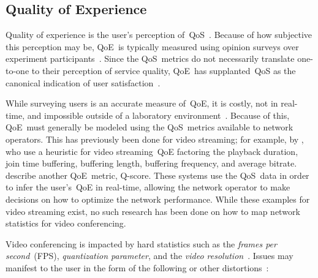 
    \subsection{Quality of Experience}\label{introduction:qoe}
        Quality of experience is the user's perception of~QoS~\autocite{ChenYanjiao2015FQtQ}. Because of how subjective this perception may be, QoE~is typically measured using opinion surveys over experiment participants~\autocite{ChenYanjiao2015FQtQ,RodrriguezDemóstenesZ2014Vqai}. Since the QoS~metrics do not necessarily translate one-to-one to their perception of service quality, QoE~has supplanted~QoS as the canonical indication of user satisfaction~\autocite{DinakiHosseinEbrahimi2021FVQW}.

        While surveying users is an accurate measure of~QoE, it is costly, not in real-time, and impossible outside of a laboratory environment~\autocite{ChenYanjiao2015FQtQ,SongHan2011Qpsq}. Because of this, QoE~must generally be modeled using the QoS~metrics available to network operators. This has previously been done for video streaming; for example, by \textcite{DinakiHosseinEbrahimi2021FVQW}, who use a heuristic for video streaming~QoE factoring the playback duration, join time buffering, buffering length, buffering frequency, and average bitrate. \Textcite{SongHan2011Qpsq} describe another QoE~metric, Q-score. These systems use the QoS~data in order to infer the user's~QoE in real-time, allowing the network operator to make decisions on how to optimize the network performance. While these examples for video streaming exist, no such research has been done on how to map network statistics for video conferencing.

        Video conferencing is impacted by hard statistics such as the \emph{frames per second}~(FPS), \emph{quantization parameter}, and the \emph{video resolution}~\autocite{MacMillanKyle2021MtPa}. Issues may manifest to the user in the form of the following or other distortions~\autocite{YuenMichael1998Asoh}:


